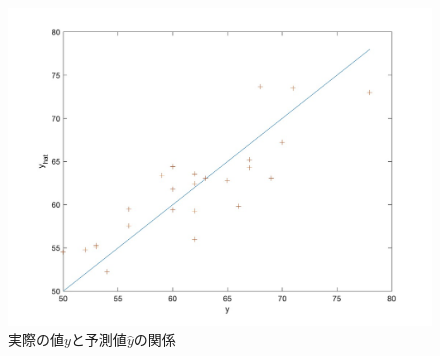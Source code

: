 \begin{figure}
	\centering
	\includegraphics[width=0.8\linewidth]{src/figures/regression/regression_ex_graph.jpg}
	\caption{実際の値$y$と予測値$\hat{y}$の関係}\label{fig:regression-ex-graph}
\end{figure}
